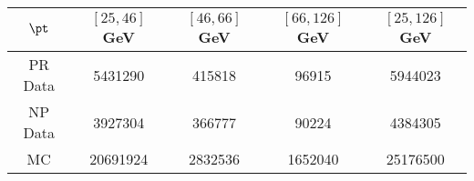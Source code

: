\begin{tabular}{c||c|c|c||c}
 $\pt$ & $[25, 46]$ GeV & $[46, 66]$ GeV & $[66, 126]$ GeV & $[25, 126]$ GeV \\
\hline
PR Data & 5431290 & 415818 & 96915 & 5944023 \\
NP Data & 3927304 & 366777 & 90224 & 4384305 \\
MC & 20691924 & 2832536 & 1652040 & 25176500 \\
\end{tabular}
